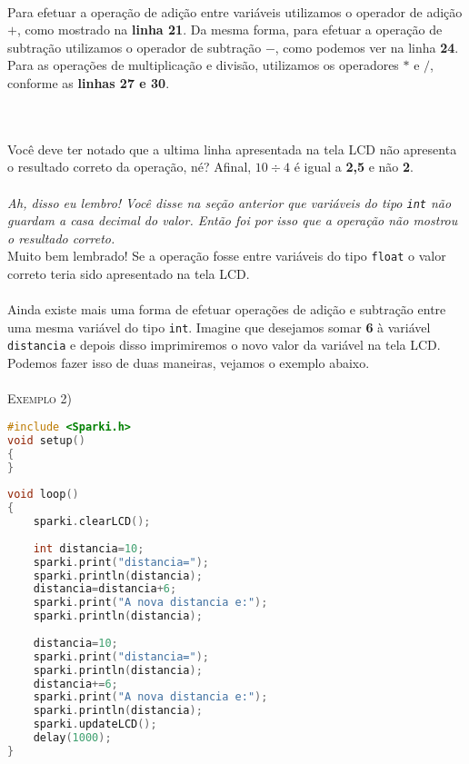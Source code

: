 \paragraph{}
Para efetuar a operação de adição entre variáveis utilizamos o operador de adição \(+\), como mostrado na \textbf{linha 21}.  Da mesma forma, para efetuar a operação de subtração utilizamos o operador de subtração \(-\), como podemos ver na linha \textbf{24}. Para as operações de multiplicação e divisão, utilizamos os operadores \(*\) e \(/\), conforme as \textbf{linhas 27 e 30}.
\begin{comment}
Inserir foto do output do código no LCD
Melhorar a apresentação visual dos operadores ao longo do texto.
\end{comment}
\\~\\
Você deve ter notado que a ultima linha apresentada na tela LCD não apresenta o resultado correto da operação, né? Afinal, \(10\div4\) é igual a \textbf{2,5} e não \textbf{2}.  
\\~\\
\textit{Ah, disso eu lembro! Você disse na seção anterior que variáveis do tipo \lstinline[columns=fixed]{int} não guardam a casa decimal do valor. Então foi por isso que a operação não mostrou o resultado correto.} \\
Muito bem lembrado! Se a operação fosse entre variáveis do tipo \lstinline[columns=fixed]{float} o valor correto teria sido apresentado na tela LCD.

\paragraph{}
Ainda existe mais uma forma de efetuar operações de adição e subtração entre uma mesma variável do tipo \lstinline[columns=fixed]{int}. 
Imagine que desejamos somar \textbf{6} à variável \lstinline[columns=fixed]{distancia} e depois disso imprimiremos o novo valor da variável na tela LCD. Podemos fazer isso de duas maneiras, vejamos o exemplo abaixo.
\\~\\
\textsc{Exemplo 2)}
\begin{lstlisting}[language=C]
#include <Sparki.h> 
void setup()
{
}
 
void loop()
{
    sparki.clearLCD();
    
    int distancia=10;
    sparki.print("distancia=");
    sparki.println(distancia);
    distancia=distancia+6;
    sparki.print("A nova distancia e:");
    sparki.println(distancia); 
    
    distancia=10;
    sparki.print("distancia=");
    sparki.println(distancia);
    distancia+=6;
    sparki.print("A nova distancia e:");
    sparki.println(distancia); 
    sparki.updateLCD();
    delay(1000); 
}
\end{lstlisting}

